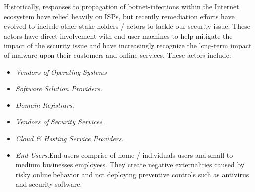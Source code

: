 Historically, responses to propagation of botnet-infections within the Internet ecosystem have relied heavily on ISPs, but recently remediation efforts have evolved to include other stake holders / actors to tackle our security issue. These actors have direct involvement with end-user machines to help mitigate the impact of the security issue and have increasingly recognize the long-term impact of malware upon their customers and online services. These actors include: 

\begin{itemize}
\item \textit{Vendors of Operating Systems}
\item \textit{Software Solution Providers.}
\item \textit{Domain Registrars.}
\item \textit{Vendors of Security Services.}
\item \textit{Cloud & Hosting Service Providers.}
\item \textit{End-Users.}End-users comprise of home / individuals users and small to medium businesses employees. They create negative externalities caused by risky online behavior and not deploying preventive controls such as antivirus and security software.
\end{itemize}
